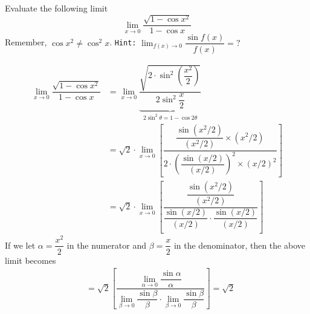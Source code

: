 



\question Evaluate the following limit \[ \lim_{x\to 0}\dfrac{\sqrt{1-\cos x^2}}{1-\cos x}\]
Remember, $\cos x^2\neq\cos^2 x$. \texttt{Hint:} $\lim_{f(x)\to 0}\dfrac{\sin f(x)}{f(x)} = ?$

\ifprintanswers
\fi

\begin{solution}
  \begin{align}
    \lim_{x\to 0}\dfrac{\sqrt{1-\cos x^2}}{1-\cos x} &=
    \lim_{x\to 0}\underbrace{\dfrac{\sqrt{2\cdot\sin^2\left(\dfrac{x^2}{2}\right)}}{2\sin^2\dfrac{x}{2}}}_{2\sin^2\theta = 1-\cos 2\theta} \\
    &= \sqrt{2}\cdot\lim_{x\to 0}\left[\dfrac
    {\dfrac{\sin (x^2/2)}{(x^2/2)}\times (x^2/2)}
    {2\cdot\left(\dfrac{\sin (x/2)}{(x/2)}\right)^2
    \times\left( x/2 \right)^2}\right] \\
    &= \sqrt{2}\cdot\lim_{x\to 0}\left[\dfrac
    {\dfrac{\sin (x^2/2)}{(x^2/2)}}
    {\dfrac{\sin (x/2)}{(x/2)}\cdot\dfrac{\sin (x/2)}{(x/2)}}\right]
  \end{align}
  If we let $\alpha = \dfrac{x^2}{2}$ in the numerator and $\beta = \dfrac{x}{2}$
  in the denominator, then the above limit becomes 
  \begin{align}
    &= \sqrt{2}\left[\dfrac{\lim_{\alpha\to 0}\dfrac{\sin\alpha}{\alpha}}
    {\lim_{\beta\to 0}\dfrac{\sin\beta}{\beta}\cdot\lim_{\beta\to 0}\dfrac{\sin\beta}{\beta}}\right] = \sqrt{2}
  \end{align}
\end{solution}

